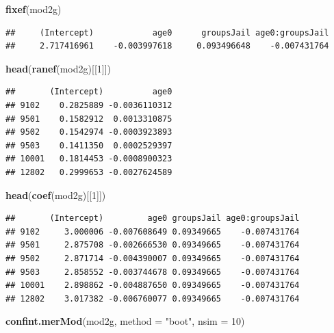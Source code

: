\documentclass[]{article}
\newenvironment{Shaded}{\begin{snugshade}}{\end{snugshade}}
\newcommand{\KeywordTok}[1]{\textcolor[rgb]{0.13,0.29,0.53}{\textbf{#1}}}
\newcommand{\DataTypeTok}[1]{\textcolor[rgb]{0.13,0.29,0.53}{#1}}
\newcommand{\DecValTok}[1]{\textcolor[rgb]{0.00,0.00,0.81}{#1}}
\newcommand{\StringTok}[1]{\textcolor[rgb]{0.31,0.60,0.02}{#1}}
\newcommand{\NormalTok}[1]{#1}
\begin{document}
\small

\begin{Shaded}
\begin{Highlighting}[]
\KeywordTok{fixef}\NormalTok{(mod2g)}
\end{Highlighting}
\end{Shaded}

\begin{verbatim}
##     (Intercept)            age0      groupsJail age0:groupsJail 
##     2.717416961    -0.003997618     0.093496648    -0.007431764
\end{verbatim}

\small

\begin{Shaded}
\begin{Highlighting}[]
\KeywordTok{head}\NormalTok{(}\KeywordTok{ranef}\NormalTok{(mod2g)[[}\DecValTok{1}\NormalTok{]])}
\end{Highlighting}
\end{Shaded}

\begin{verbatim}
##       (Intercept)          age0
## 9102    0.2825889 -0.0036110312
## 9501    0.1582912  0.0013310875
## 9502    0.1542974 -0.0003923893
## 9503    0.1411350  0.0002529397
## 10001   0.1814453 -0.0008900323
## 12802   0.2999653 -0.0027624589
\end{verbatim}

\begin{Shaded}
\begin{Highlighting}[]
\KeywordTok{head}\NormalTok{(}\KeywordTok{coef}\NormalTok{(mod2g)[[}\DecValTok{1}\NormalTok{]])}
\end{Highlighting}
\end{Shaded}

\begin{verbatim}
##       (Intercept)         age0 groupsJail age0:groupsJail
## 9102     3.000006 -0.007608649 0.09349665    -0.007431764
## 9501     2.875708 -0.002666530 0.09349665    -0.007431764
## 9502     2.871714 -0.004390007 0.09349665    -0.007431764
## 9503     2.858552 -0.003744678 0.09349665    -0.007431764
## 10001    2.898862 -0.004887650 0.09349665    -0.007431764
## 12802    3.017382 -0.006760077 0.09349665    -0.007431764
\end{verbatim}

\small

\begin{Shaded}
\begin{Highlighting}[]
\KeywordTok{confint.merMod}\NormalTok{(mod2g, }\DataTypeTok{method =} \StringTok{"boot"}\NormalTok{, }\DataTypeTok{nsim =} \DecValTok{10}\NormalTok{)}
\end{Highlighting}
\end{Shaded}
\end{document}
